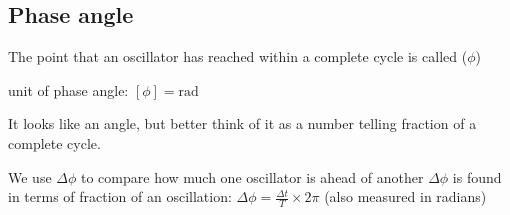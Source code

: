 \subsection{Phase angle}
The point that an oscillator has reached within a complete cycle is called  ($\phi$)

\cmt unit of phase angle: $[\phi] = \text{rad}$

It looks like an angle, but better think of it as a number telling fraction of a complete cycle.

We use  $\Delta\phi$ to compare how much one oscillator is ahead of another $\Delta\phi$ is found in terms of fraction of an oscillation: $\Delta\phi = \frac{\Delta t}{T} \times 2\pi $ (also measured in radians)



%
%


